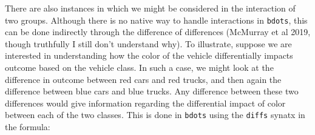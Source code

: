 \documentclass{article}
\newcommand{\xt}{\texttt}%
\begin{document}
There are also instances in which we might be considered in the interaction of two groups. Although there is no native way to handle interactions in \xt{bdots}, this can be done indirectly through the difference of differences (McMurray et al 2019, though truthfully I still don't understand why). To illustrate, suppose we are interested in understanding how the color of the vehicle differentially impacts outcome based on the vehicle class. In such a case, we might look at the difference in outcome between red cars and red trucks, and then again the difference between blue cars and blue trucks. Any difference between these two differences would give information regarding the differential impact of color between each of the two classes. This is done in \xt{bdots} using the \xt{diffs} synatx in the formula:





\end{document}
